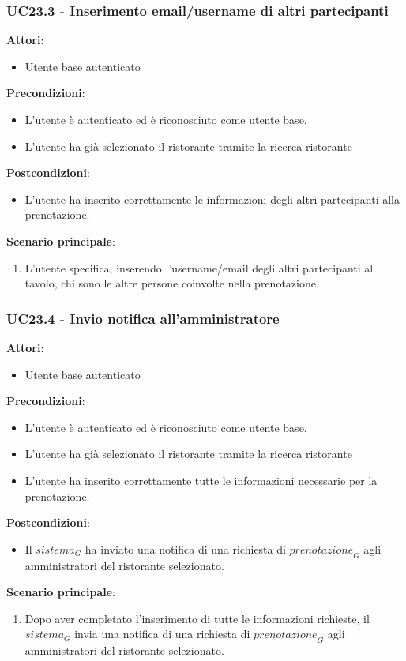 \subsubsection{UC23.3 - Inserimento email/username di altri partecipanti}\label{usecase:23_3}
\textbf{Attori}:
\begin{itemize}
    \item Utente base autenticato
\end{itemize}
\textbf{Precondizioni}:
\begin{itemize}
    \item L'utente è autenticato ed è riconosciuto come utente base.
    \item L'utente ha già selezionato il ristorante tramite la ricerca ristorante 
\end{itemize}
\textbf{Postcondizioni}:
\begin{itemize}
    \item L'utente ha inserito correttamente le informazioni degli altri partecipanti alla prenotazione.
\end{itemize}
\textbf{Scenario principale}:
\begin{enumerate}
    \item L'utente specifica, inserendo l'username/email degli altri partecipanti al tavolo, chi sono le altre persone coinvolte nella prenotazione.
\end{enumerate}


\subsubsection{UC23.4 - Invio notifica all'amministratore
}\label{usecase:23_4}
\textbf{Attori}:
\begin{itemize}
    \item Utente base autenticato
\end{itemize}
\textbf{Precondizioni}:
\begin{itemize}
    \item L'utente è autenticato ed è riconosciuto come utente base.
    \item L'utente ha già selezionato il ristorante tramite la ricerca ristorante 
    \item L'utente ha inserito correttamente tutte le informazioni necessarie per la prenotazione.
\end{itemize}
\textbf{Postcondizioni}:
\begin{itemize}
    \item Il $\textit{sistema}_G$ ha inviato una notifica di una richiesta di $\textit{prenotazione}_G$ agli amministratori del ristorante selezionato.
\end{itemize}
\textbf{Scenario principale}:
\begin{enumerate}
    \item Dopo aver completato l'inserimento di tutte le informazioni richieste, il $\textit{sistema}_G$ invia una notifica di una richiesta di $\textit{prenotazione}_G$ agli amministratori del ristorante selezionato.
\end{enumerate}



\newpage
